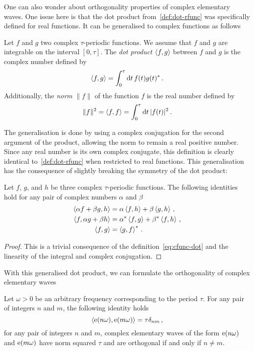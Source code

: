One can also wonder about orthogonality properties of complex elementary waves. One issue
here is that the dot product from~\cref{def:dot-rfunc} was specifically defined for real
functions. It can be generalised to complex functions as follows
\begin{definition}
  Let $f$ and $g$ two complex $\tau$-periodic functions. We assume that $f$ and $g$ are
  integrable on the interval $[0,\tau]$. The \emph{dot product} $\braket{f,g}$ between $f$
  and $g$ is the complex number defined by
  \begin{equation}
    \braket{f,g}=\int_{0}^{\tau}\mathrm{d} t\, f(t)g(t)^*\,.\label{eq:cfunc-dot}
  \end{equation}
  Additionally, the \emph{norm} $\|f\|$ of the function $f$ is the real number defined by
  \begin{equation}
    \|f\|^2=\braket{f,f}=\int_{0}^{\tau}\mathrm{d} t\, |f(t)|^2\,.
  \end{equation}
\end{definition}
The generalisation is done by using a complex conjugation for the second argument of the
product, allowing the norm to remain a real positive number. Since any real number is its
own complex conjugate, this definition is clearly identical to~\cref{def:dot-rfunc} when restricted to
real functions. This generalisation has the consequence of slightly breaking the symmetry
of the dot product:
\begin{proposition}
  Let $f$, $g$, and $h$ be three complex $\tau$-periodic functions. The following identities
  hold for any pair of complex numbers $\alpha$ and $\beta$
  \begin{align}
    \braket{\alpha f+\beta g,h}&=\alpha\braket{f,h}+\beta\braket{g,h}\,,\\
    \braket{f,\alpha g+\beta h}&=\alpha^*\braket{f,g}+\beta^*\braket{f,h}\,,\\
    \braket{f,g}&=\braket{g,f}^*\,.
  \end{align}
\end{proposition}
\begin{proof}
  This is a trivial consequence of the definition~\cref{eq:cfunc-dot} and the linearity of
  the integral and complex conjugation.
\end{proof}
With this generalised dot product, we can formulate the orthogonality of complex
elementary waves
\begin{theorem}
  Let $\omega>0$ be an arbitrary frequency corresponding to the period $\tau$. For any pair
  of integers $n$ and $m$, the following identity holds
  \begin{equation}
    \braket{\operatorname{e}(n\omega),\operatorname{e}(m\omega)}=\tau\delta_{nm}\,,
  \end{equation}
  \ie for any pair of integers $n$ and $m$, complex elementary waves of the form
  $\operatorname{e}(n\omega)$ and $\operatorname{e}(m\omega)$ have norm squared $\tau$ and are orthogonal if and only
  if $n\neq m$.
\end{theorem}
